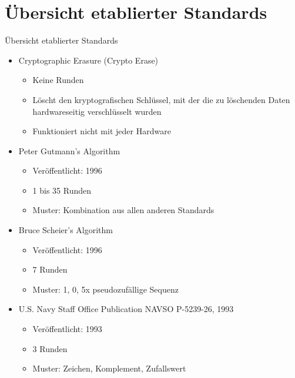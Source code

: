\documentclass{beamer}
\begin{document}
\section{Übersicht etablierter Standards}
\begin{frame}{Übersicht etablierter Standards}
	\begin{itemize}
		\item Cryptographic Erasure (Crypto Erase)
			\begin{itemize}
				\item Keine Runden
				\item Löscht den kryptografischen Schlüssel, mit der die zu
					löschenden Daten hardwareseitig verschlüsselt wurden
				\item Funktioniert nicht mit jeder Hardware
			\end{itemize}
		\item Peter Gutmann's Algorithm
			\begin{itemize}
				\item Veröffentlicht: 1996
				\item 1 bis 35 Runden
				\item Muster: Kombination aus allen anderen Standards
			\end{itemize}
		\item Bruce Scheier's Algorithm
			\begin{itemize}
				\item Veröffentlicht: 1996
				\item 7 Runden
				\item Muster: 1, 0, 5x pseudozufällige Sequenz
			\end{itemize}
		\item U.S. Navy Staff Office Publication NAVSO P-5239-26, 1993
			\begin{itemize}
				\item Veröffentlicht: 1993
				\item 3 Runden
				\item Muster: Zeichen, Komplement, Zufallswert
			\end{itemize}
	\end{itemize}
\end{frame}
\end{document}
